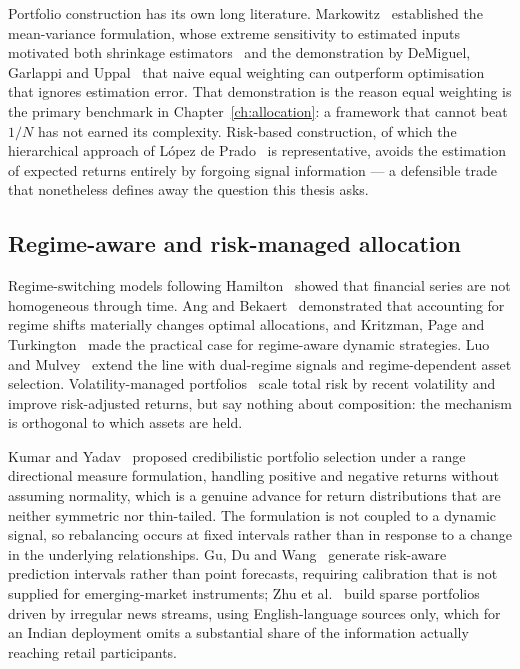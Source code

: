 Portfolio construction has its own long literature. Markowitz~\cite{markowitz1952} established
the mean-variance formulation, whose extreme sensitivity to estimated inputs motivated both
shrinkage estimators~\cite{ledoit2004} and the demonstration by DeMiguel, Garlappi and
Uppal~\cite{demiguel2009} that naive equal weighting can outperform optimisation that ignores
estimation error. That demonstration is the reason equal weighting is the primary benchmark in
Chapter~\ref{ch:allocation}: a framework that cannot beat $1/N$ has not earned its complexity.
Risk-based construction, of which the hierarchical approach of López de
Prado~\cite{lopezdeprado2016} is representative, avoids the estimation of expected returns
entirely by forgoing signal information --- a defensible trade that nonetheless defines away the
question this thesis asks.

\subsection{Regime-aware and risk-managed allocation}

Regime-switching models following Hamilton~\cite{hamilton1989} showed that financial series are
not homogeneous through time. Ang and Bekaert~\cite{ang2002} demonstrated that accounting for
regime shifts materially changes optimal allocations, and Kritzman, Page and
Turkington~\cite{kritzman2012} made the practical case for regime-aware dynamic strategies. Luo
and Mulvey~\cite{luo2026regime} extend the line with dual-regime signals and regime-dependent
asset selection. Volatility-managed portfolios~\cite{moreira2017} scale total risk by recent
volatility and improve risk-adjusted returns, but say nothing about composition: the mechanism
is orthogonal to which assets are held.

Kumar and Yadav~\cite{kumar2024rdmdea} proposed credibilistic portfolio selection under a range
directional measure formulation, handling positive and negative returns without assuming
normality, which is a genuine advance for return distributions that are neither symmetric nor
thin-tailed. The formulation is not coupled to a dynamic signal, so rebalancing occurs at fixed
intervals rather than in response to a change in the underlying relationships. Gu, Du and
Wang~\cite{gu2025ragic} generate risk-aware prediction intervals rather than point forecasts,
requiring calibration that is not supplied for emerging-market instruments; Zhu et
al.~\cite{zhu2025spin} build sparse portfolios driven by irregular news streams, using
English-language sources only, which for an Indian deployment omits a substantial share of the
information actually reaching retail participants.

